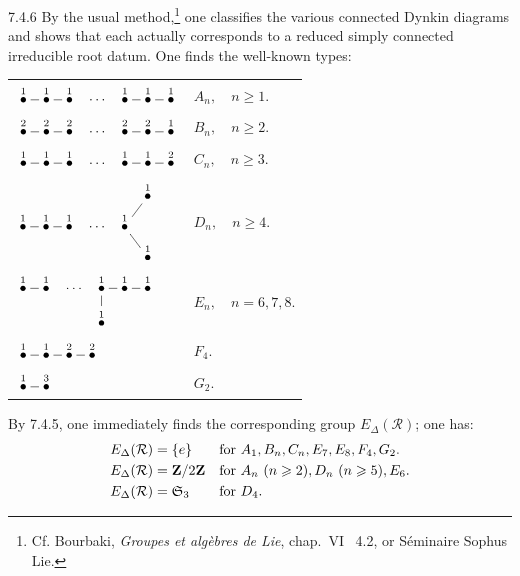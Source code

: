 \begin{remark}{7.4.6}\label{XXI.7.4.6}
By the usual method,{\renewcommand{\thefootnote}{($*$)}\footnote{Cf. Bourbaki, \textit{Groupes et alg\`ebres de Lie}, chap.~VI \No~4.2, or S\'eminaire Sophus Lie.}}{\renewcommand{\thefootnote}{(30)}} one classifies the various connected Dynkin diagrams and shows that each actually corresponds to a reduced simply connected irreducible root datum. One finds the well-known types:
\begin{center}
\begin{tabular}{ll}
$\xymatrix@C=0.55em{\overset{1}{\bullet}\ar@{-}[r]&\overset{1}{\bullet}\ar@{-}[r]&\overset{1}{\bullet}&\cdots&\overset{1}{\bullet}\ar@{-}[r]&\overset{1}{\bullet}\ar@{-}[r]&\overset{1}{\bullet}}$&$A_n,\quad n\geq1.$\\[1em]
$\xymatrix@C=0.55em{\overset{2}{\bullet}\ar@{-}[r]&\overset{2}{\bullet}\ar@{-}[r]&\overset{2}{\bullet}&\cdots&\overset{2}{\bullet}\ar@{-}[r]&\overset{2}{\bullet}\ar@{-}[r]&\overset{1}{\bullet}}$&$B_n,\quad n\geq2.$\\[1em]
$\xymatrix@C=0.55em{\overset{1}{\bullet}\ar@{-}[r]&\overset{1}{\bullet}\ar@{-}[r]&\overset{1}{\bullet}&\cdots&\overset{1}{\bullet}\ar@{-}[r]&\overset{1}{\bullet}\ar@{-}[r]&\overset{2}{\bullet}}$&$C_n,\quad n\geq3.$\\[1em]
$\xymatrix@C=0.55em@R=0.4em{&&&&&\overset{1}{\bullet}\\
\overset{1}{\bullet}\ar@{-}[r]&\overset{1}{\bullet}\ar@{-}[r]&\overset{1}{\bullet}&\cdots&\overset{1}{\bullet}\ar@{-}[ur]\ar@{-}[dr]&\\
&&&&&\overset{1}{\bullet}}$&$D_n,\quad n\geq4.$\\[1em]
$\xymatrix@C=0.55em@R=0.7em{\overset{1}{\bullet}\ar@{-}[r]&\overset{1}{\bullet}&\cdots&\overset{1}{\bullet}\ar@{-}[r]\ar@{-}[d]&\overset{1}{\bullet}\ar@{-}[r]&\overset{1}{\bullet}\\
&&&\overset{1}{\bullet}&&}$&$E_n,\quad n=6,7,8.$\\[1em]
$\xymatrix@C=0.55em{\overset{1}{\bullet}\ar@{-}[r]&\overset{1}{\bullet}\ar@{-}[r]&\overset{2}{\bullet}\ar@{-}[r]&\overset{2}{\bullet}}$&$F_4.$\\[1em]
$\xymatrix@C=0.55em{\overset{1}{\bullet}\ar@{-}[r]&\overset{3}{\bullet}}$&$G_2.$
\end{tabular}
\end{center}
By 7.4.5, one immediately finds the corresponding group $E_\Delta(\mathcal R)$; one has:
\[
\begin{aligned}
E_\Delta(\mathcal R)&=\{e\}&&\text{for }A_1,B_n,C_n,E_7,E_8,F_4,G_2.\\
E_\Delta(\mathcal R)&=\ZZ/2\ZZ&&\text{for }A_n\ (n\geq2),D_n\ (n\geq5),E_6.\\
E_\Delta(\mathcal R)&=\mathfrak S_3&&\text{for }D_4.
\end{aligned}
\]
\end{remark}

